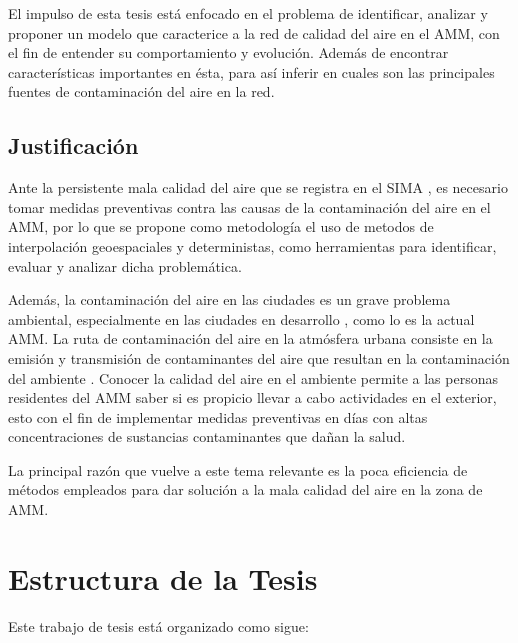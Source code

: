 El impulso de esta tesis está enfocado en el problema de identificar, analizar y proponer un modelo que caracterice a la red de calidad del aire en el AMM, con el fin de entender su comportamiento y evolución. Además de encontrar características importantes en ésta, para así inferir en cuales son las principales fuentes de contaminación del aire en la red.

\subsection{Justificación}

Ante la persistente mala calidad del aire que se registra en el SIMA \citep{sdsdnl}, es necesario tomar medidas preventivas contra las causas de la contaminación del aire en el AMM, por lo que se propone como metodología el uso de metodos de interpolación geoespaciales y deterministas, como herramientas para identificar, evaluar y analizar dicha problemática.

Además, la contaminación del aire en las ciudades es un grave problema ambiental, especialmente en las ciudades en desarrollo \citep{mayer}, como lo es la actual AMM.  La ruta de contaminación del aire en la atmósfera urbana consiste en la emisión y transmisión de contaminantes del aire que resultan en la contaminación del ambiente \citep{alloway}. Conocer la calidad del aire en el ambiente permite a las personas residentes del AMM saber si es propicio llevar a cabo actividades en el exterior, esto con el fin de implementar medidas preventivas en días con altas concentraciones de sustancias contaminantes que dañan la salud.

La principal razón que vuelve a este tema relevante es la poca eficiencia de métodos empleados para dar solución a la mala calidad del aire en la zona de AMM.

\section{Estructura de la Tesis}

Este trabajo de tesis está organizado como sigue:

